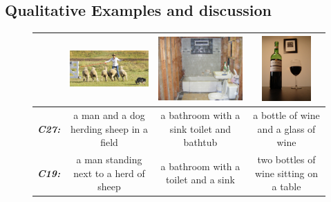 \subsection{Qualitative Examples and discussion}
\begin{figure}[bth]
  \begin{center}
  \newcommand{\mcCell}[1]{%
          \multicolumn{1}{|c|}{#1}}
  \centering
  \begin{adjustbox}{center}
  \begin{tabular}{c|c|c|c|}
          \cline{2-4}
    &\includegraphics[width=0.25\linewidth,height=2.5cm]{images/COCO_val2014_000000502766.jpg} &
    \includegraphics[width=0.25\linewidth,height=2.5cm]{images/COCO_val2014_000000161720.jpg} &
    \includegraphics[width=0.25\linewidth,height=2.5cm]{images/COCO_val2014_000000385707.jpg} \\\hline
    \mcCell{\textbf{\em\scriptsize C27:}}& \parbox[c][][c]{0.25\linewidth}{\smallskip \scriptsize a man and a dog herding sheep in a field\smallskip} &
     \parbox[c][][c]{0.25\linewidth}{\smallskip \scriptsize a bathroom with a sink toilet and bathtub\smallskip} &
     \parbox[c][][c]{0.25\linewidth}{\smallskip \scriptsize a bottle of wine and a glass of wine\smallskip}\\\hline
     \mcCell{\textbf{\em\scriptsize C19:}}& \parbox[c][][c]{0.25\linewidth}{\smallskip \scriptsize a man standing next to a herd of sheep\smallskip}&
     \parbox[c][][c]{0.25\linewidth}{\smallskip \scriptsize a bathroom with a toilet and a sink\smallskip}&
     \parbox[c][][c]{0.25\linewidth}{\smallskip \scriptsize two bottles of wine sitting on a table\smallskip}\\\hline

\end{tabular}
\end{adjustbox}
\end{center}
\end{figure}
